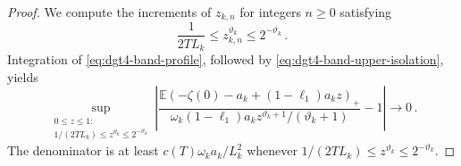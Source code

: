 \documentclass[11pt]{amsart}
\theoremstyle{plain}
\theoremstyle{definition}
\newcommand{\E}{\mathbb{E}}
\begin{document}
\begin{proof}
	We compute the increments of $z_{k,n}$ for integers $n\geq0$ satisfying
	\begin{equation}\label{eq:dgt4-band-index-range}
		\frac1{2TL_k}
		\leq z_{k,n}^{\vartheta_k}
		\leq2^{-\vartheta_k}\, .
	\end{equation}
	Integration of \eqref{eq:dgt4-band-profile}, followed by
	\eqref{eq:dgt4-band-upper-isolation}, yields
	\begin{equation}\label{eq:dgt4-band-integrated-profile}
		\sup_{\substack{0\leq z\leq1:\\
		1/(2TL_k)\leq z^{\vartheta_k}\leq2^{-\vartheta_k}}}
		\left|
		\frac{
		\E(-\zeta(0)-a_k+(1-\ell_{1})a_kz)_+
		}{
		\omega_k(1-\ell_{1})a_kz^{\vartheta_k+1}/(\vartheta_k+1)
		}
		-1
		\right|
		\longrightarrow0\, .
	\end{equation}
	The denominator is at least
	$c(T)\omega_ka_k/L_k^2$ whenever
	$1/(2TL_k)\leq z^{\vartheta_k}\leq2^{-\vartheta_k}$.


\end{proof}
\end{document}
